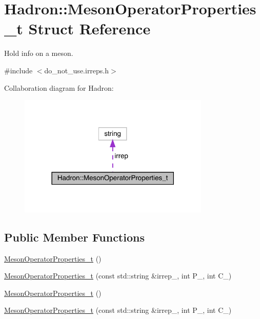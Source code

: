 \hypertarget{structHadron_1_1MesonOperatorProperties__t}{}\section{Hadron\+:\+:Meson\+Operator\+Properties\+\_\+t Struct Reference}
\label{structHadron_1_1MesonOperatorProperties__t}


Hold info on a meson.  




{\ttfamily \#include $<$do\+\_\+not\+\_\+use.\+irreps.\+h$>$}



Collaboration diagram for Hadron\+:\nopagebreak
\begin{figure}[H]
\begin{center}
\leavevmode
\includegraphics[width=258pt]{df/d4d/structHadron_1_1MesonOperatorProperties__t__coll__graph}
\end{center}
\end{figure}
\subsection*{Public Member Functions}
\begin{DoxyCompactItemize}
\item 
\mbox{\hyperlink{structHadron_1_1MesonOperatorProperties__t_aa487d0682fa07b3cf7f81dae4575cdd4}{Meson\+Operator\+Properties\+\_\+t}} ()
\item 
\mbox{\hyperlink{structHadron_1_1MesonOperatorProperties__t_a28d5b4aa6225854a98bc838c9c9872ea}{Meson\+Operator\+Properties\+\_\+t}} (const std\+::string \&irrep\+\_\+, int P\+\_\+, int C\+\_\+)
\item 
\mbox{\hyperlink{structHadron_1_1MesonOperatorProperties__t_aa487d0682fa07b3cf7f81dae4575cdd4}{Meson\+Operator\+Properties\+\_\+t}} ()
\item 
\mbox{\hyperlink{structHadron_1_1MesonOperatorProperties__t_a28d5b4aa6225854a98bc838c9c9872ea}{Meson\+Operator\+Properties\+\_\+t}} (const std\+::string \&irrep\+\_\+, int P\+\_\+, int C\+\_\+)
\end{DoxyCompactItemize}

